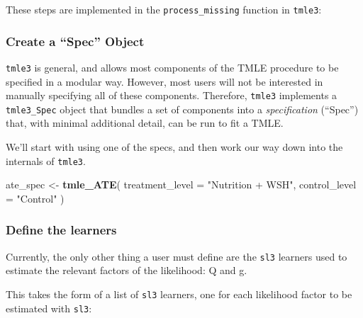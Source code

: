 \documentclass[12pt, krantz2,]{krantz}
\newenvironment{Shaded}{\begin{snugshade}}{\end{snugshade}}
\newcommand{\DataTypeTok}[1]{\textcolor[rgb]{0.27,0.27,0.27}{#1}}
\newcommand{\KeywordTok}[1]{\textcolor[rgb]{0.27,0.27,0.27}{\textbf{#1}}}
\newcommand{\NormalTok}[1]{#1}
\newcommand{\OperatorTok}[1]{\textcolor[rgb]{0.43,0.43,0.43}{\textbf{#1}}}
\newcommand{\StringTok}[1]{\textcolor[rgb]{0.5,0.5,0.5}{#1}}
\theoremstyle{definition}
\theoremstyle{definition}
\theoremstyle{definition}
\newcommand{\1}{\mathbbm{1}}
\begin{document}
These steps are implemented in the \texttt{process\_missing} function in \texttt{tmle3}:

\begin{Shaded}
\end{Shaded}

\hypertarget{create-a-spec-object}{%
\subsubsection{Create a ``Spec'' Object}\label{create-a-spec-object}}

\texttt{tmle3} is general, and allows most components of the TMLE procedure to be
specified in a modular way. However, most users will not be interested in
manually specifying all of these components. Therefore, \texttt{tmle3} implements a
\texttt{tmle3\_Spec} object that bundles a set of components into a \emph{specification}
(``Spec'') that, with minimal additional detail, can be run to fit a TMLE.

We'll start with using one of the specs, and then work our way down into the
internals of \texttt{tmle3}.

\begin{Shaded}
\begin{Highlighting}[]
\NormalTok{ate_spec <-}\StringTok{ }\KeywordTok{tmle_ATE}\NormalTok{(}
  \DataTypeTok{treatment_level =} \StringTok{"Nutrition + WSH"}\NormalTok{,}
  \DataTypeTok{control_level =} \StringTok{"Control"}
\NormalTok{)}
\end{Highlighting}
\end{Shaded}

\hypertarget{define-the-learners}{%
\subsubsection{Define the learners}\label{define-the-learners}}

Currently, the only other thing a user must define are the \texttt{sl3} learners used
to estimate the relevant factors of the likelihood: Q and g.

This takes the form of a list of \texttt{sl3} learners, one for each likelihood factor
to be estimated with \texttt{sl3}:
\end{document}
